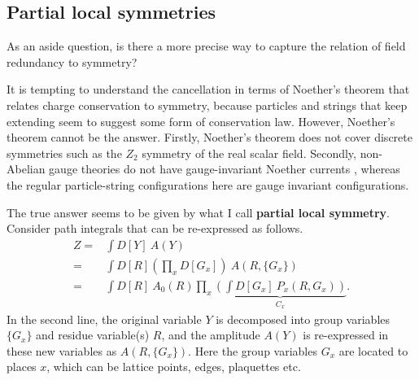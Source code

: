 \documentclass[12pt]{article}
\theoremstyle{definition}
\begin{document}


\subsection{Partial local symmetries}


As an aside question, is there a more precise way to capture the relation of field redundancy to symmetry?

It is tempting to understand the cancellation in terms of Noether's theorem that relates charge conservation to symmetry, because particles and strings that keep extending seem to suggest some form of conservation law. However, Noether's theorem cannot be the answer. Firstly, Noether's theorem does not cover discrete symmetries such as the $Z_2$ symmetry of the real scalar field. Secondly, non-Abelian gauge theories do not have gauge-invariant Noether currents \cite{Schwartz2013QuantumModel}, whereas the regular particle-string configurations here are gauge invariant configurations.

The true answer seems to be given by what I call \textbf{partial local symmetry}. Consider path integrals that can be re-expressed as follows.
\begin{align*}
Z=&\int D[Y] ~A(Y)
\\
=&\int D[R] (\prod_x D[G_x]) ~A(R,\{G_x\})
\\
=&\int D[R] ~A_0(R) \prod_x \underbrace{(\int D[G_x]~ P_x(R,G_x))}_{C_x}.
\end{align*}
In the second line, the original variable $Y$ is decomposed into group variables $\{G_x\}$ and residue variable(s) $R$, and the amplitude $A(Y)$ is re-expressed in these new variables as $A(R,\{G_x\})$. Here the group variables $G_x$ are located to places $x$, which can be lattice points, edges, plaquettes etc.
\end{document}
